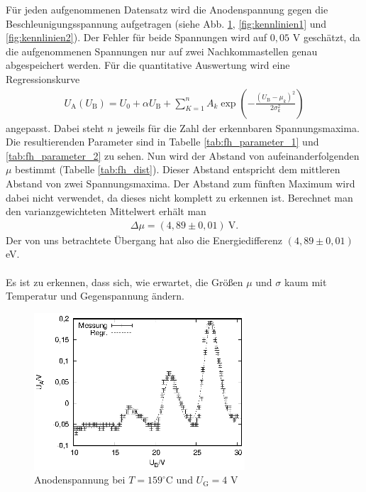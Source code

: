 Für jeden aufgenommenen Datensatz wird die Anodenspannung gegen die Beschleunigungsspannung aufgetragen (siehe Abb. \ref{fig:159K4V}, \ref{fig:kennlinien1} und \ref{fig:kennlinien2}). Der Fehler für beide Spannungen wird auf $0,05$ V geschätzt, da die aufgenommenen Spannungen nur auf zwei Nachkommastellen genau abgespeichert werden. Für die quantitative Auswertung wird eine Regressionskurve
\begin{align*}
  U_\mathrm{A}(U_\mathrm{B})=U_0+\alpha U_\mathrm{B}+\sum_{K=1}^nA_k\exp \left(-\frac{(U_\mathrm{B}-\mu_k)^2}{2\sigma_k^2} \right)
\end{align*}
angepasst. Dabei steht $n$ jeweils für die Zahl der erkennbaren Spannungsmaxima. Die resultierenden Parameter sind in Tabelle \ref{tab:fh_parameter_1} und \ref{tab:fh_parameter_2} zu sehen. Nun wird der Abstand von aufeinanderfolgenden $\mu$ bestimmt (Tabelle \ref{tab:fh_dist}). Dieser Abstand entspricht dem mittleren Abstand von zwei Spannungsmaxima. Der Abstand zum fünften Maximum wird dabei nicht verwendet, da dieses nicht komplett zu erkennen ist. Berechnet man den varianzgewichteten Mittelwert erhält man 
\begin{align*}
  \Delta \mu=(4,89 \pm 0,01)\mathrm{\ V.}
\end{align*}
Der von uns betrachtete Übergang hat also die Energiedifferenz $(4,89 \pm 0,01)$ eV. \\ \\
Es ist zu erkennen, dass sich, wie erwartet, die Größen $\mu$ und $\sigma$ kaum mit Temperatur und Gegenspannung ändern. 

\newpage

\begin{figure}[h]
  \centering
  \includegraphics[width=0.7\textwidth]{data/fh/159K4V.eps}
  \caption{Anodenspannung bei $T=159^\circ$C und $U_\mathrm{G}=4$ V}
  \label{fig:159K4V}
\end{figure}


